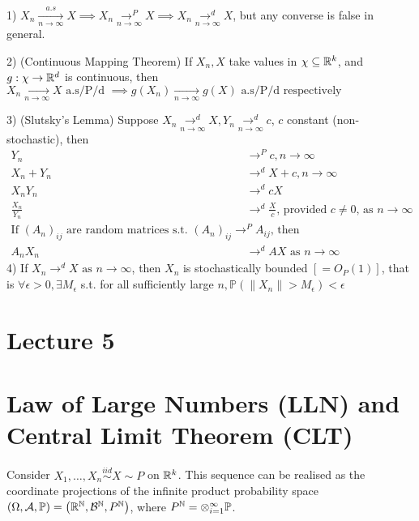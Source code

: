 \documentclass[a4paper]{article}
\begin{document}
\begin{prop}
	1) $X_n \underset{n\to \infty}{\overset{a.s}{\to}} X \implies X_n \underset{n\to \infty}{\to^{P}} X \implies X_n \underset{n\to \infty}{\to^{d}} X$, but any converse is false in general.

	2) (Continuous Mapping Theorem) If $X_n, X$ take values in $\chi \subseteq \mathbb{R}^{k} $, and $g:\chi \to \mathbb{R}^{d}$ is continuous, then $X_n \underset{n\to \infty}{\to} X \text{ a.s/P/d } \implies g(X_n) \underset{n \to  \infty}{\to} g(X) \text{ a.s/P/d respectively} $

	3) (Slutsky's Lemma) Suppose $X_n \underset{n\to \infty}{\to^{d}} X, Y_n \underset{n\to \infty}{\to^{d}} c$,  $c$ constant (non-stochastic), then
	 \begin{align*}
		 Y_n &\to ^{P} c, n\to \infty  \\
		 X_n + Y_n &\to^{d} X + c, n\to \infty  \\
		 X_nY_n &\to^{d} cX \\
		 \frac{X_n}{Y_n} &\to ^{d} \frac{X}{c} \text{, provided $c \neq 0$, as $n\to \infty$ } \\
		 \text{If $(A_n)_{ij}$ are random matrices s.t. $(A_n)_{ij} \to^{P} A_{ij}$, then} \\
		 A_n X_n &\to^{d} AX \text{ as } n\to \infty
	 \end{align*}
	 4) If $X_n \to^{d} X \text{ as } n \to \infty$, then $X_n$ is stochastically bounded $\left[ = O_P(1) \right]$, that is $\forall \epsilon > 0, \exists M_{\epsilon}$ s.t. for all sufficiently large  $n, \mathbb{P}\left( \|X_n\| > M_{\epsilon} \right) < \epsilon$ 

\end{prop}

\section*{Lecture 5}

\section{Law of Large Numbers (LLN) and Central Limit Theorem (CLT)}

Consider $X_1,\ldots,X_n \stackrel{iid}{\sim} X \sim P$ on $\mathbb{R}^{k}$. This sequence can be realised as the coordinate projections of the infinite product probability space $\left( \Omega, \mathcal{A}, \mathbb{P} \right) = \left( \mathbb{R}^{\mathbb{N}}, \mathcal{B}^{\mathbb{N}}, P^{\mathbb{N}} \right)$, where $P^{\mathbb{N}} = \otimes_{i=1}^{\infty} \mathbb{P}$.
\end{document}
